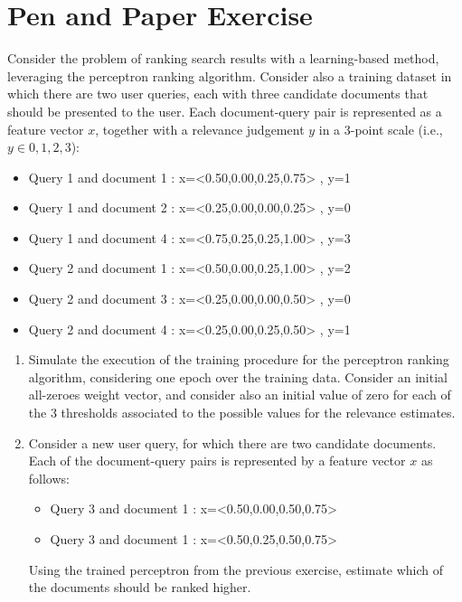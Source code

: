 \documentclass[12pt]{article}
\begin{document}
\section{Pen and Paper Exercise}

Consider the problem of ranking search results with a learning-based method, leveraging the perceptron ranking algorithm. Consider also a training dataset in which there are two user queries, each with three candidate documents that should be presented to the user. Each document-query pair is represented as a feature vector $x$, together with a relevance judgement $y$ in a 3-point scale (i.e., $y \in {0,1,2,3}$):

\begin{itemize}
\item Query 1 and document 1 : x=<0.50,0.00,0.25,0.75> , y=1
\item Query 1 and document 2 : x=<0.25,0.00,0.00,0.25> , y=0
\item Query 1 and document 4 : x=<0.75,0.25,0.25,1.00> , y=3

\item Query 2 and document 1 : x=<0.50,0.00,0.25,1.00> , y=2
\item Query 2 and document 3 : x=<0.25,0.00,0.00,0.50> , y=0
\item Query 2 and document 4 : x=<0.25,0.00,0.25,0.50> , y=1
\end{itemize}

\begin{enumerate}
\item Simulate the execution of the training procedure for the perceptron ranking algorithm, considering one epoch over the training data. Consider an initial all-zeroes weight vector, and consider also an initial value of zero for each of the 3 thresholds associated to the possible values for the relevance estimates.

\item Consider a new user query, for which there are two candidate documents. Each of the document-query pairs is represented by a feature vector $x$ as follows:

\begin{itemize}
\item Query 3 and document 1 : x=<0.50,0.00,0.50,0.75>
\item Query 3 and document 1 : x=<0.50,0.25,0.50,0.75>
\end{itemize}

Using the trained perceptron from the previous exercise, estimate which of the documents should be ranked higher.
\end{enumerate}
\end{document}
